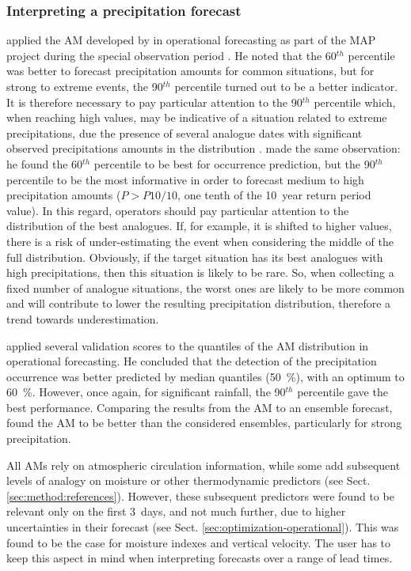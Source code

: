 \documentclass[review]{elsarticle}
\begin{document}
\subsubsection{Interpreting a precipitation forecast}
\label{sec:interpreting}

\citet{Djerboua2001} applied the AM developed by \citet{Guilbaud1997} in operational forecasting as part of the MAP project \citep[\textit{Mesoscale Alpine Programme}, see][]{Binder1996} during the special observation period \citep{Bougeault2001}. He noted that the 60$^{th}$ percentile was better to forecast precipitation amounts for common situations, but for strong to extreme events, the 90$^{th}$ percentile turned out to be a better indicator. It is therefore necessary to pay particular attention to the 90$^{th}$ percentile which, when reaching high values, may be indicative of a situation related to extreme precipitations, due the presence of several analogue dates with significant observed precipitations amounts in the distribution \citep{Djerboua2001}. \citet{Bontron2004} made the same observation: he found the 60$^{th}$ percentile to be best for occurrence prediction, but the 90$^{th}$ percentile to be the most informative in order to forecast medium to high precipitation amounts ($P > P10/10$, one tenth of the 10~year return period value). In this regard, operators should pay particular attention to the distribution of the best analogues. If, for example, it is shifted to higher values, there is a risk of under-estimating the event when considering the middle of the full distribution. Obviously, if the target situation has its best analogues with high precipitations, then this situation is likely to be rare. So, when collecting a fixed number of analogue situations, the worst ones are likely to be more common and will contribute to lower the resulting precipitation distribution, therefore a trend towards underestimation.


\citet{Marty2010} applied several validation scores to the quantiles of the AM distribution in operational forecasting. He concluded that the detection of the precipitation occurrence was better predicted by median quantiles (50~\%), with an optimum to 60~\%. However, once again, for significant rainfall, the 90$^{th}$ percentile gave the best performance. Comparing the results from the AM to an ensemble forecast, \citet{Marty2010} found the AM to be better than the considered ensembles, particularly for strong precipitation.

All AMs rely on atmospheric circulation information, while some add subsequent levels of analogy on moisture or other thermodynamic predictors (see Sect. \ref{sec:method:references}). However, these subsequent predictors were found to be relevant only on the first 3~days, and not much further, due to higher uncertainties in their forecast (see Sect. \ref{sec:optimization-operational}). This was found to be the case for moisture indexes and vertical velocity. The user has to keep this aspect in mind when interpreting forecasts over a range of lead times.
\end{document}
